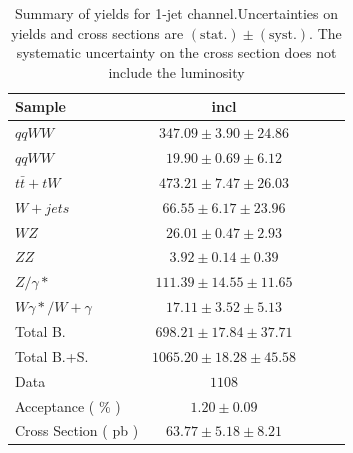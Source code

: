 \begin{table}[!ht]
{\small
\begin{center}
\begin{tabular}{|l|c|c|c|c|}
\hline
Sample  & incl  \\ \hline
$qqWW$  & $347.09 \pm 3.90 \pm 24.86 $  \\
$qqWW$  & $19.90 \pm 0.69 \pm 6.12 $    \\
$t\bar{t} + tW$ & $473.21 \pm 7.47 \pm 26.03 $  \\
$W+jets$    & $66.55 \pm 6.17 \pm 23.96 $   \\
$WZ$    & $26.01 \pm 0.47 \pm 2.93 $    \\
$ZZ$    & $3.92 \pm 0.14 \pm 0.39 $ \\
$Z/\gamma*$ & $111.39 \pm 14.55 \pm 11.65 $ \\
$W\gamma*/W+\gamma$ & $17.11 \pm 3.52 \pm 5.13 $    \\
\hline \hline
Total B.    & $698.21 \pm 17.84 \pm 37.71 $ \\ \hline \hline
Total B.+S. & $1065.20 \pm 18.28 \pm 45.58 $    \\ \hline \hline
Data    & $1108$    \\ \hline \hline
Acceptance ( \% )   & $1.20 \pm 0.09    $\\
Cross Section ( pb )    & $63.77 \pm 5.18 \pm 8.21$     \\ \hline
\end{tabular}
\caption{Summary of yields for 1-jet channel.Uncertainties on yields and cross sections are $\mathrm{(stat.)} \pm \mathrm{(syst.)}$. The systematic uncertainty on the cross section does not include the luminosity}
\label{tab:datayields_wwxsec_1j_incl}
\end{center}}
\end{table}

